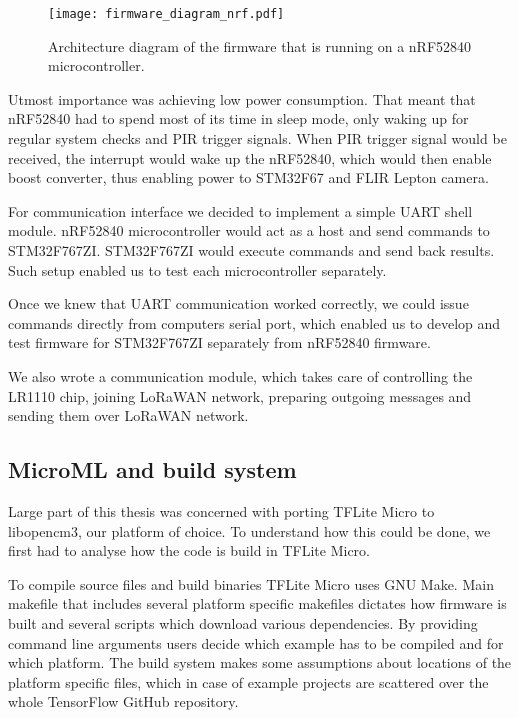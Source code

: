 \begin{figure}[ht]
        \centering
        \texttt{[image: firmware\_diagram\_nrf.pdf]} 
        \caption{ Architecture diagram of the firmware that is running on a nRF52840 microcontroller.} 
        \label{firmware_diagram_wisent}
\end{figure}

Utmost importance was achieving low power consumption.
That meant that nRF52840 had to spend most of its time in sleep mode, only waking up for regular system checks and PIR trigger signals.
When PIR trigger signal would be received, the interrupt would wake up the nRF52840, which would then enable boost converter, thus enabling power to STM32F67 and FLIR Lepton camera.

For communication interface we decided to implement a simple UART shell module.
nRF52840 microcontroller would act as a host and send commands to STM32F767ZI.
STM32F767ZI would execute commands and send back results.
Such setup enabled us to test each microcontroller separately.

Once we knew that UART communication worked correctly, we could issue commands directly from computers serial port, which enabled us to develop and test firmware for STM32F767ZI separately from nRF52840 firmware.

We also wrote a communication module, which takes care of controlling the LR1110 chip, joining LoRaWAN network, preparing outgoing messages and sending them over LoRaWAN network.


\subsection{ MicroML and build system} \label{build_system_label}

Large part of this thesis was concerned with porting TFLite Micro to libopencm3, our platform of choice.
To understand how this could be done, we first had to analyse how the code is build in TFLite Micro.

To compile source files and build binaries TFLite Micro uses GNU Make.
Main makefile that includes several platform specific makefiles dictates how firmware is built and several scripts which download various dependencies.
By providing command line arguments users decide which example has to be compiled and for which platform.
The build system makes some assumptions about locations of the platform specific files, which in case of example projects are scattered over the whole TensorFlow GitHub repository.


